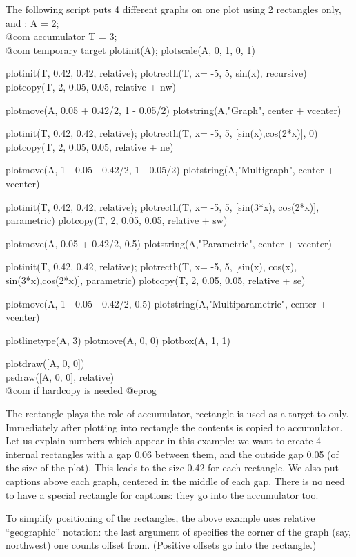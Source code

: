 The following script puts 4 different graphs on one plot using 2 rectangles
only,  and :
\bprog
A = 2;   \\@com accumulator
T = 3;   \\@com temporary target
plotinit(A);         plotscale(A, 0, 1, 0, 1)

plotinit(T, 0.42, 0.42, relative);
plotrecth(T, x= -5, 5, sin(x), recursive)
plotcopy(T, 2, 0.05, 0.05, relative + nw)

plotmove(A, 0.05 + 0.42/2, 1 - 0.05/2)
plotstring(A,"Graph", center + vcenter)

plotinit(T, 0.42, 0.42, relative);
plotrecth(T, x= -5, 5, [sin(x),cos(2*x)], 0)
plotcopy(T, 2, 0.05, 0.05, relative + ne)

plotmove(A, 1 - 0.05 - 0.42/2, 1 - 0.05/2)
plotstring(A,"Multigraph", center + vcenter)

plotinit(T, 0.42, 0.42, relative);
plotrecth(T, x= -5, 5, [sin(3*x), cos(2*x)], parametric)
plotcopy(T, 2, 0.05, 0.05, relative + sw)

plotmove(A, 0.05 + 0.42/2, 0.5)
plotstring(A,"Parametric", center + vcenter)

plotinit(T, 0.42, 0.42, relative);
plotrecth(T, x= -5, 5, [sin(x), cos(x), sin(3*x),cos(2*x)], parametric)
plotcopy(T, 2, 0.05, 0.05, relative + se)

plotmove(A, 1 - 0.05 - 0.42/2, 0.5)
plotstring(A,"Multiparametric", center + vcenter)

plotlinetype(A, 3)
plotmove(A, 0, 0)
plotbox(A, 1, 1)

plotdraw([A, 0, 0])
\\ psdraw([A, 0, 0], relative)          \\ @com if hardcopy is needed
@eprog

The rectangle  plays the role of accumulator, rectangle  is
used as a target to  only.  Immediately after plotting into 
rectangle  the contents is copied to accumulator.  Let us explain
numbers which appear in this example: we want to create 4 internal rectangles
with a gap 0.06 between them, and the outside gap 0.05 (of the size of the
plot).  This leads to the size 0.42 for each rectangle.  We also
put captions above each graph, centered in the middle of each gap.  There
is no need to have a special rectangle for captions: they go into the
accumulator too.

To simplify positioning of the rectangles, the above example uses relative
``geographic'' notation: the last argument of  specifies the
corner of the graph (say, northwest) one counts offset from. (Positive
offsets go into the rectangle.)

